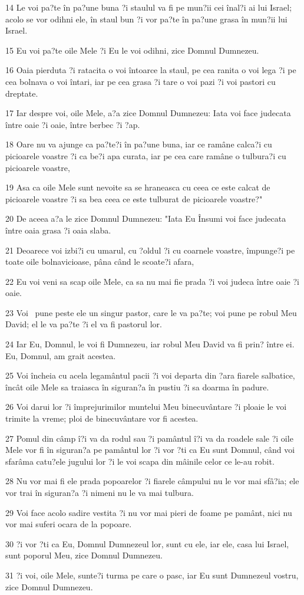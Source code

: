 \par 14 Le voi pa?te în pa?une buna ?i staulul va fi pe mun?ii cei înal?i ai lui Israel; acolo se vor odihni ele, în staul bun ?i vor pa?te în pa?une grasa în mun?ii lui Israel.
\par 15 Eu voi pa?te oile Mele ?i Eu le voi odihni, zice Domnul Dumnezeu.
\par 16 Oaia pierduta ?i ratacita o voi întoarce la staul, pe cea ranita o voi lega ?i pe cea bolnava o voi întari, iar pe cea grasa ?i tare o voi pazi ?i voi pastori cu dreptate.
\par 17 Iar despre voi, oile Mele, a?a zice Domnul Dumnezeu: Iata voi face judecata între oaie ?i oaie, între berbec ?i ?ap.
\par 18 Oare nu va ajunge ca pa?te?i în pa?une buna, iar ce ramâne calca?i cu picioarele voastre ?i ca be?i apa curata, iar pe cea care ramâne o tulbura?i cu picioarele voastre,
\par 19 Asa ca oile Mele sunt nevoite sa se hraneasca cu ceea ce este calcat de picioarele voastre ?i sa bea ceea ce este tulburat de picioarele voastre?"
\par 20 De aceea a?a le zice Domnul Dumnezeu: "Iata Eu Însumi voi face judecata între oaia grasa ?i oaia slaba.
\par 21 Deoarece voi izbi?i cu umarul, cu ?oldul ?i cu coarnele voastre, împunge?i pe toate oile bolnavicioase, pâna când le scoate?i afara,
\par 22 Eu voi veni sa scap oile Mele, ca sa nu mai fie prada ?i voi judeca între oaie ?i oaie.
\par 23 Voi  pune peste ele un singur pastor, care le va pa?te; voi pune pe robul Meu David; el le va pa?te ?i el va fi pastorul lor.
\par 24 Iar Eu, Domnul, le voi fi Dumnezeu, iar robul Meu David va fi prin? între ei. Eu, Domnul, am grait acestea.
\par 25 Voi încheia cu acela legamântul pacii ?i voi departa din ?ara fiarele salbatice, încât oile Mele sa traiasca în siguran?a în pustiu ?i sa doarma în padure.
\par 26 Voi darui lor ?i împrejurimilor muntelui Meu binecuvântare ?i ploaie le voi trimite la vreme; ploi de binecuvântare vor fi acestea.
\par 27 Pomul din câmp î?i va da rodul sau ?i pamântul î?i va da roadele sale ?i oile Mele vor fi în siguran?a pe pamântul lor ?i vor ?ti ca Eu sunt Domnul, când voi sfarâma catu?ele jugului lor ?i le voi scapa din mâinile celor ce le-au robit.
\par 28 Nu vor mai fi ele prada popoarelor ?i fiarele câmpului nu le vor mai sfâ?ia; ele vor trai în siguran?a ?i nimeni nu le va mai tulbura.
\par 29 Voi face acolo sadire vestita ?i nu vor mai pieri de foame pe pamânt, nici nu vor mai suferi ocara de la popoare.
\par 30 ?i vor ?ti ca Eu, Domnul Dumnezeul lor, sunt cu ele, iar ele, casa lui Israel, sunt poporul Meu, zice Domnul Dumnezeu.
\par 31 ?i voi, oile Mele, sunte?i turma pe care o pasc, iar Eu sunt Dumnezeul vostru, zice Domnul Dumnezeu.

